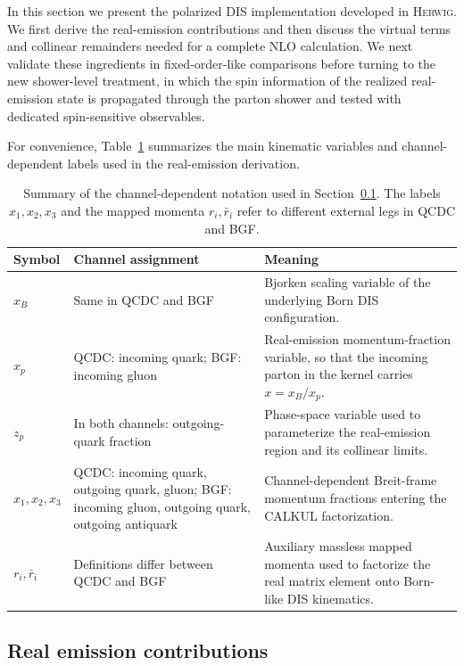 \documentclass[a4paper,11pt]{article}
\newcommand{\Herwig}{\textsc{Herwig}}
\begin{document}
In this section we present the polarized DIS implementation developed in
\Herwig. We first derive the real-emission contributions and then discuss the
virtual terms and collinear remainders needed for a complete NLO calculation. We
next validate these ingredients in fixed-order-like comparisons before turning
to the new shower-level treatment, in which the spin information of the
realized real-emission state is propagated through the parton shower and tested
with dedicated spin-sensitive observables.

For convenience, Table~\ref{tab:dis-notation-summary} summarizes the main kinematic variables and channel-dependent labels used in the real-emission derivation.

\begin{table}[t]
  \centering
  \footnotesize
  \setlength{\tabcolsep}{4pt}
  \begin{tabular}{|p{}|p{}|p{}|}
    \hline
    Symbol & Channel assignment & Meaning \\
    \hline
    $x_B$ & Same in QCDC and BGF & Bjorken scaling variable of the underlying Born DIS configuration. \\
    \hline
    $x_p$ & QCDC: incoming quark; BGF: incoming gluon & Real-emission momentum-fraction variable, so that the incoming parton in the kernel carries $x=x_B/x_p$. \\
    \hline
    $z_p$ & In both channels: outgoing-quark fraction & Phase-space variable used to parameterize the real-emission region and its collinear limits. \\
    \hline
    $x_1,x_2,x_3$ & QCDC: incoming quark, outgoing quark, gluon; BGF: incoming gluon, outgoing quark, outgoing antiquark & Channel-dependent Breit-frame momentum fractions entering the CALKUL factorization. \\
    \hline
    $r_i,\bar r_i$ & Definitions differ between QCDC and BGF & Auxiliary massless mapped momenta used to factorize the real matrix element onto Born-like DIS kinematics. \\
    \hline
  \end{tabular}
  \caption{Summary of the channel-dependent notation used in Section~\ref{sec:realconts}. The labels $x_1,x_2,x_3$ and the mapped momenta $r_i,\bar r_i$ refer to different external legs in QCDC and BGF.}
  \label{tab:dis-notation-summary}
\end{table}

\subsection{Real emission contributions}
\label{sec:realconts}
\end{document}
